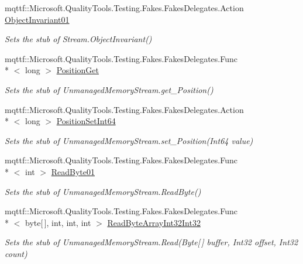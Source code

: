 \begin{DoxyCompactItemize}
mqttf\-::\-Microsoft.\-Quality\-Tools.\-Testing.\-Fakes.\-Fakes\-Delegates.\-Action \hyperlink{class_system_1_1_i_o_1_1_fakes_1_1_stub_unmanaged_memory_stream_a58a59182bcb27c1f6116a74b709ae9e4}{Object\-Invariant01}
\begin{DoxyCompactList}\small\item\em Sets the stub of Stream.\-Object\-Invariant()\end{DoxyCompactList}\item 
mqttf\-::\-Microsoft.\-Quality\-Tools.\-Testing.\-Fakes.\-Fakes\-Delegates.\-Func\\*
$<$ long $>$ \hyperlink{class_system_1_1_i_o_1_1_fakes_1_1_stub_unmanaged_memory_stream_a8be370433512ca0689f786fb412048da}{Position\-Get}
\begin{DoxyCompactList}\small\item\em Sets the stub of Unmanaged\-Memory\-Stream.\-get\-\_\-\-Position()\end{DoxyCompactList}\item 
mqttf\-::\-Microsoft.\-Quality\-Tools.\-Testing.\-Fakes.\-Fakes\-Delegates.\-Action\\*
$<$ long $>$ \hyperlink{class_system_1_1_i_o_1_1_fakes_1_1_stub_unmanaged_memory_stream_a3ece392b4334b09addc5f8d25bc3fcf2}{Position\-Set\-Int64}
\begin{DoxyCompactList}\small\item\em Sets the stub of Unmanaged\-Memory\-Stream.\-set\-\_\-\-Position(\-Int64 value)\end{DoxyCompactList}\item 
mqttf\-::\-Microsoft.\-Quality\-Tools.\-Testing.\-Fakes.\-Fakes\-Delegates.\-Func\\*
$<$ int $>$ \hyperlink{class_system_1_1_i_o_1_1_fakes_1_1_stub_unmanaged_memory_stream_aadd3ba1a63022f0c7944d725684d7c6c}{Read\-Byte01}
\begin{DoxyCompactList}\small\item\em Sets the stub of Unmanaged\-Memory\-Stream.\-Read\-Byte()\end{DoxyCompactList}\item 
mqttf\-::\-Microsoft.\-Quality\-Tools.\-Testing.\-Fakes.\-Fakes\-Delegates.\-Func\\*
$<$ byte\mbox{[}$\,$\mbox{]}, int, int, int $>$ \hyperlink{class_system_1_1_i_o_1_1_fakes_1_1_stub_unmanaged_memory_stream_afa06cedcf634d93f1cb6eb8e2c5fa798}{Read\-Byte\-Array\-Int32\-Int32}
\begin{DoxyCompactList}\small\item\em Sets the stub of Unmanaged\-Memory\-Stream.\-Read(\-Byte\mbox{[}$\,$\mbox{]} buffer, Int32 offset, Int32 count)\end{DoxyCompactList}\item 

\end{DoxyCompactItemize}
